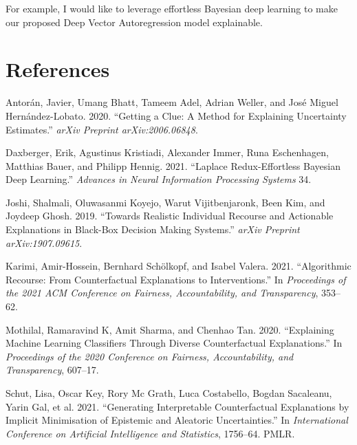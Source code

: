 \documentclass[
]{acmconf}
\newlength{\cslhangindent}
\newlength{\cslentryspacingunit} %
\newenvironment{CSLReferences}[2] %
 {%
  \setlength{\parindent}{0pt}
  \ifodd #1
  \let\oldpar\par
  \def\par{\hangindent=\cslhangindent\oldpar}
  \fi
  \setlength{\parskip}{#2\cslentryspacingunit}
 }%
 {}
\begin{document}
For example, I would like to leverage effortless Bayesian deep learning
to make our proposed Deep Vector Autoregression model explainable.

\hypertarget{references}{%
\section*{References}\label{references}}

\hypertarget{refs}{}
\begin{CSLReferences}{1}{0}
\leavevmode{}%
Antorán, Javier, Umang Bhatt, Tameem Adel, Adrian Weller, and José
Miguel Hernández-Lobato. 2020. {``Getting a Clue: A Method for
Explaining Uncertainty Estimates.''} \emph{arXiv Preprint
arXiv:2006.06848}.

\leavevmode{}%
Daxberger, Erik, Agustinus Kristiadi, Alexander Immer, Runa Eschenhagen,
Matthias Bauer, and Philipp Hennig. 2021. {``Laplace Redux-Effortless
Bayesian Deep Learning.''} \emph{Advances in Neural Information
Processing Systems} 34.

\leavevmode{}%
Joshi, Shalmali, Oluwasanmi Koyejo, Warut Vijitbenjaronk, Been Kim, and
Joydeep Ghosh. 2019. {``Towards Realistic Individual Recourse and
Actionable Explanations in Black-Box Decision Making Systems.''}
\emph{arXiv Preprint arXiv:1907.09615}.

\leavevmode{}%
Karimi, Amir-Hossein, Bernhard Schölkopf, and Isabel Valera. 2021.
{``Algorithmic Recourse: From Counterfactual Explanations to
Interventions.''} In \emph{Proceedings of the 2021 ACM Conference on
Fairness, Accountability, and Transparency}, 353--62.

\leavevmode{}%
Mothilal, Ramaravind K, Amit Sharma, and Chenhao Tan. 2020.
{``Explaining Machine Learning Classifiers Through Diverse
Counterfactual Explanations.''} In \emph{Proceedings of the 2020
Conference on Fairness, Accountability, and Transparency}, 607--17.

\leavevmode{}%
Schut, Lisa, Oscar Key, Rory Mc Grath, Luca Costabello, Bogdan
Sacaleanu, Yarin Gal, et al. 2021. {``Generating Interpretable
Counterfactual Explanations by Implicit Minimisation of Epistemic and
Aleatoric Uncertainties.''} In \emph{International Conference on
Artificial Intelligence and Statistics}, 1756--64. PMLR.


\end{CSLReferences}
\end{document}
